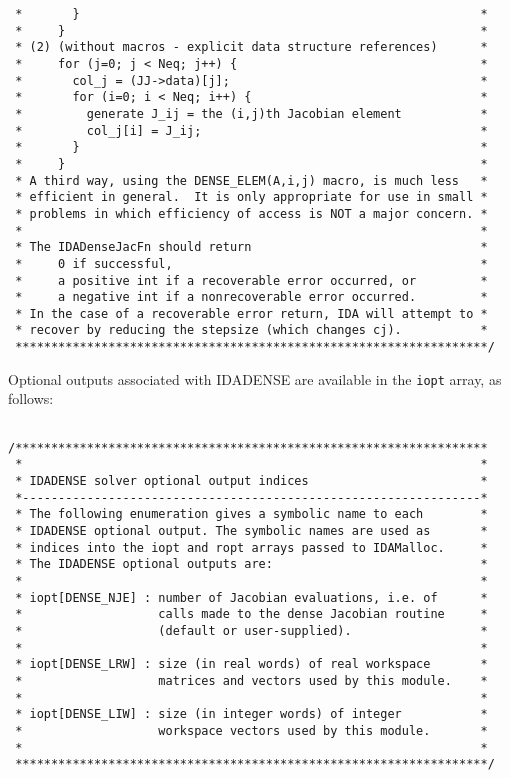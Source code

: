 \documentclass[11pt]{article}
\begin{document}
\begin{verbatim}
 *       }                                                        *
 *     }                                                          *
 * (2) (without macros - explicit data structure references)      *
 *     for (j=0; j < Neq; j++) {                                  *
 *       col_j = (JJ->data)[j];                                   *
 *       for (i=0; i < Neq; i++) {                                *
 *         generate J_ij = the (i,j)th Jacobian element           *
 *         col_j[i] = J_ij;                                       *
 *       }                                                        *
 *     }                                                          *
 * A third way, using the DENSE_ELEM(A,i,j) macro, is much less   *
 * efficient in general.  It is only appropriate for use in small *
 * problems in which efficiency of access is NOT a major concern. *
 *                                                                *
 * The IDADenseJacFn should return                                *
 *     0 if successful,                                           *
 *     a positive int if a recoverable error occurred, or         *
 *     a negative int if a nonrecoverable error occurred.         *
 * In the case of a recoverable error return, IDA will attempt to *
 * recover by reducing the stepsize (which changes cj).           *
 ******************************************************************/

\end{verbatim}
\normalsize

Optional outputs associated with IDADENSE are available in the 
{\tt iopt} array, as follows:

\small
\begin{verbatim}
 
/******************************************************************
 *                                                                *
 * IDADENSE solver optional output indices                        *
 *----------------------------------------------------------------*
 * The following enumeration gives a symbolic name to each        *
 * IDADENSE optional output. The symbolic names are used as       *
 * indices into the iopt and ropt arrays passed to IDAMalloc.     *
 * The IDADENSE optional outputs are:                             *
 *                                                                *
 * iopt[DENSE_NJE] : number of Jacobian evaluations, i.e. of      *
 *                   calls made to the dense Jacobian routine     *
 *                   (default or user-supplied).                  *
 *                                                                *
 * iopt[DENSE_LRW] : size (in real words) of real workspace       *
 *                   matrices and vectors used by this module.    *
 *                                                                *
 * iopt[DENSE_LIW] : size (in integer words) of integer           *
 *                   workspace vectors used by this module.       *
 *                                                                *
 ******************************************************************/

\end{verbatim}
\normalsize
 
\end{document}
